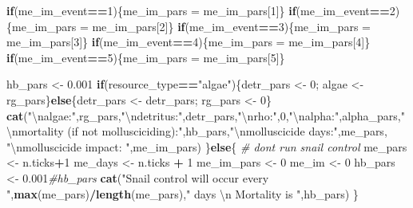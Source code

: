 \documentclass[10,portrait]{article}
\newenvironment{Shaded}{\begin{snugshade}}{\end{snugshade}}
\newcommand{\KeywordTok}[1]{\textcolor[rgb]{0.13,0.29,0.53}{\textbf{#1}}}
\newcommand{\DecValTok}[1]{\textcolor[rgb]{0.00,0.00,0.81}{#1}}
\newcommand{\FloatTok}[1]{\textcolor[rgb]{0.00,0.00,0.81}{#1}}
\newcommand{\CharTok}[1]{\textcolor[rgb]{0.31,0.60,0.02}{#1}}
\newcommand{\StringTok}[1]{\textcolor[rgb]{0.31,0.60,0.02}{#1}}
\newcommand{\CommentTok}[1]{\textcolor[rgb]{0.56,0.35,0.01}{\textit{#1}}}
\newcommand{\ControlFlowTok}[1]{\textcolor[rgb]{0.13,0.29,0.53}{\textbf{#1}}}
\newcommand{\OperatorTok}[1]{\textcolor[rgb]{0.81,0.36,0.00}{\textbf{#1}}}
\newcommand{\NormalTok}[1]{#1}
\begin{document}
\begin{Shaded}
\begin{Highlighting}[]
{{{          
          \ControlFlowTok{if}\NormalTok{(me_im_event}\OperatorTok{==}\DecValTok{1}\NormalTok{)\{me_im_pars =}\StringTok{ }\NormalTok{me_im_pars[}\DecValTok{1}\NormalTok{]\}}
          \ControlFlowTok{if}\NormalTok{(me_im_event}\OperatorTok{==}\DecValTok{2}\NormalTok{)\{me_im_pars =}\StringTok{ }\NormalTok{me_im_pars[}\DecValTok{2}\NormalTok{]\}}
          \ControlFlowTok{if}\NormalTok{(me_im_event}\OperatorTok{==}\DecValTok{3}\NormalTok{)\{me_im_pars =}\StringTok{ }\NormalTok{me_im_pars[}\DecValTok{3}\NormalTok{]\}}
          \ControlFlowTok{if}\NormalTok{(me_im_event}\OperatorTok{==}\DecValTok{4}\NormalTok{)\{me_im_pars =}\StringTok{ }\NormalTok{me_im_pars[}\DecValTok{4}\NormalTok{]\}}
          \ControlFlowTok{if}\NormalTok{(me_im_event}\OperatorTok{==}\DecValTok{5}\NormalTok{)\{me_im_pars =}\StringTok{ }\NormalTok{me_im_pars[}\DecValTok{5}\NormalTok{]\}}
          
\NormalTok{          hb_pars <-}\StringTok{ }\FloatTok{0.001}
          \ControlFlowTok{if}\NormalTok{(resource_type}\OperatorTok{==}\StringTok{"algae"}\NormalTok{)\{detr_pars <-}\StringTok{ }\DecValTok{0}\NormalTok{; algae <-}\StringTok{ }\NormalTok{rg_pars\}}\ControlFlowTok{else}\NormalTok{\{detr_pars <-}\StringTok{ }\NormalTok{detr_pars; rg_pars <-}\StringTok{ }\DecValTok{0}\NormalTok{\}}
          \KeywordTok{cat}\NormalTok{(}\StringTok{"}\CharTok{\textbackslash{}n}\StringTok{algae:"}\NormalTok{,rg_pars,}\StringTok{"}\CharTok{\textbackslash{}n}\StringTok{detritus:"}\NormalTok{,detr_pars,}\StringTok{"}\CharTok{\textbackslash{}n}\StringTok{rho:"}\NormalTok{,}\DecValTok{0}\NormalTok{,}\StringTok{"}\CharTok{\textbackslash{}n}\StringTok{alpha:"}\NormalTok{,alpha_pars,}\StringTok{"}\CharTok{\textbackslash{}n}\StringTok{mortality (if not mollusciciding):"}\NormalTok{,hb_pars,}\StringTok{"}\CharTok{\textbackslash{}n}\StringTok{molluscicide days:"}\NormalTok{,me_pars, }\StringTok{"}\CharTok{\textbackslash{}n}\StringTok{molluscicide impact: "}\NormalTok{,me_im_pars)}
\NormalTok{        \}}\ControlFlowTok{else}\NormalTok{\{ }\CommentTok{# dont run snail control }
\NormalTok{          me_pars <-}\StringTok{ }\NormalTok{n.ticks}\OperatorTok{+}\DecValTok{1}
\NormalTok{          me_days <-}\StringTok{ }\NormalTok{n.ticks }\OperatorTok{+}\StringTok{ }\DecValTok{1}
\NormalTok{          me_im_pars <-}\StringTok{ }\DecValTok{0}
\NormalTok{          me_im <-}\StringTok{ }\DecValTok{0}
\NormalTok{          hb_pars <-}\StringTok{ }\FloatTok{0.001}\CommentTok{#hb_pars}
          \KeywordTok{cat}\NormalTok{(}\StringTok{"Snail control will occur every "}\NormalTok{,}\KeywordTok{max}\NormalTok{(me_pars)}\OperatorTok{/}\KeywordTok{length}\NormalTok{(me_pars),}\StringTok{" days }\CharTok{\textbackslash{}n}\StringTok{ Mortality is "}\NormalTok{,hb_pars) }
\NormalTok{        \}}
        
}}}
\end{Highlighting}
\end{Shaded}
\end{document}

